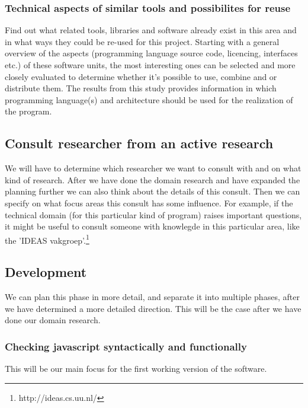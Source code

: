 \documentclass{article}
\begin{document}
\subsubsection{Technical aspects of similar tools and possibilites for reuse}
Find out what related tools, libraries and software already exist in this area and in what ways they could be re-used for this project. Starting with a general overview of the aspects (programming language source code, licencing, interfaces etc.) of these software units, the most interesting ones can be selected and more closely evaluated to determine whether it's possible to use, combine and or distribute them. The results from this study provides information in which programming language(s) and architecture should be used for the realization of the program.

\subsection{Consult researcher from an active research}
We will have to determine which researcher we want to consult with and on what kind of research. After we have done the domain research and have expanded the planning further we can also think about the details of this consult. Then we can specify on what focus areas this consult has some influence. For example, if the technical domain (for this particular kind of program) raises important questions, it might be useful to consult someone with knowlegde in this particular area, like the 'IDEAS vakgroep'.\footnote{http://ideas.cs.uu.nl/}\\

\subsection{Development}
We can plan this phase in more detail, and separate it into multiple phases, after we have determined a more detailed direction. This will be the case after we have done our domain research.

\subsubsection{Checking javascript syntactically and functionally}
This will be our main focus for the first working version of the software.
\end{document}
